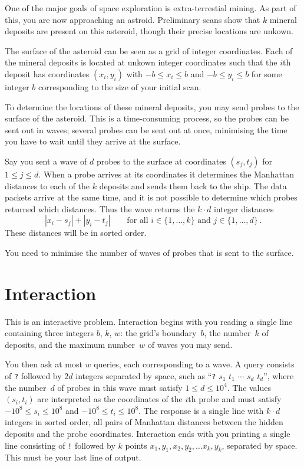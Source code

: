 

\noindent
One of the major goals of space exploration is extra-terrestial mining. 
As part of this, you are now approaching an astroid. 
Preliminary scans show that $k$ mineral deposits are present on this asteroid, though their precise locations are unkown.

\medskip

The surface of the asteroid can be seen as a grid of integer coordinates.
Each of the mineral deposits is located at unkown integer coordinates such that the $i$th deposit has coordinates $(x_i, y_i)$ with  
$-b \le x_i \le b$ and $-b\le y_i \le b$ %
for some integer $b$ corresponding to the size of your initial scan.

To determine the locations of these mineral deposits, you may send probes to the surface of the asteroid. 
This is a time-consuming process, so the probes can be sent out in waves;
several probes can be sent out at once, minimising the time you have to wait until they arrive at the surface.

Say you sent a wave of $d$ probes to the surface at coordinates $(s_j,t_j)$ for $1\leq j\leq d$.
When a probe arrives at its coordinates it determines the Manhattan distances to each of the $k$ deposits and sends them back to the ship. 
The data packets arrive at the same time, and it is not possible to determine which probes returned which distances. 
Thus the wave returns the $k\cdot d$ integer distances
\[|x_i-s_j| + |y_i - t_j| \qquad\text{for all } i \in \{1,\ldots,k\} \text{ and } j \in\{ 1,\ldots,d\}\,.\]
These distances will be in sorted order.

You need to minimise the number of waves of probes that is sent to the surface.


\section*{Interaction}

This is an interactive problem.
Interaction begins with you reading a single line containing three integers $b$, $k$, $w$:
the grid's boundary~$b$,
the number~$k$ of deposits,
and the maximum number~$w$ of waves you may send.

You then ask at most $w$ queries, each corresponding to a wave.
A query consists of \texttt{?} followed by $2d$ integers separated by space, such as ``\texttt{?} $s_1$ $t_1$ $\cdots$ $s_d$ $t_d$'', where the number~$d$ of probes in this wave must satisfy
$1\leq d\leq 10^4$. %
The values $(s_i,t_i)$ are interpreted as the coordinates of the $i$th probe and must satisfy
$-10^8 \leq s_i \leq 10^8$ and $-10^8 \leq t_i \leq 10^8$. %
The response is a single line with $k \cdot d$ integers in sorted order, all pairs of Manhattan distances between the hidden deposits and the probe coordinates.
Interaction ends with you printing a single line consisting of \texttt{!} followed by $k$ points $x_1, y_1, x_2, y_2, \ldots x_k, y_k$, separated by space.
This must be your last line of output.

